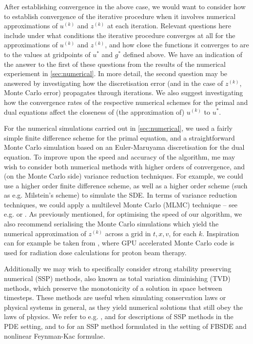 After establishing convergence in the above case, we would want to consider how to establish convergence of the iterative procedure when it involves numerical approximations of $u^{(k)}$ and $z^{(k)}$ at each iteration. Relevant questions here include under what conditions the iterative procedure converges at all for the approximations of $u^{(k)}$ and $z^{(k)}$, and how close the functions it converges to are to the values at gridpoints of $u^{*}$ and $g^{*}$ defined above. We have an indication of the answer to the first of these questions from the results of the numerical experiement in \autoref{sec:numerical}. In more detail, the second question may be answered by investigating how the discretisation error (and in the case of $z^{(k)}$, Monte Carlo error) propagates through iterations. We also suggest investigating how the convergence rates of the respective numerical schemes for the primal and dual equations affect the closeness of (the approximation of) $u^{(k)}$ to $u^{*}$.

For the numerical simulations carried out in \autoref{sec:numerical}, we used a fairly simple finite difference scheme for the primal equation, and a straightforward Monte Carlo simulation based on an Euler-Maruyama discretisation for the dual equation. To improve upon the speed and accuracy of the algorithm, me may wish to consider both numerical methods with higher orders of convergence, and (on the Monte Carlo side) variance reduction techniques. For example, we could use a higher order finite difference scheme, as well as a higher order scheme (such as e.g. Milstein's scheme) to simulate the SDE. In terms of variance reduction techniques, we could apply a multilevel Monte Carlo (MLMC) technique -- see e.g. \cite{giles2008multilevel} or \cite{gobet2016monte}. As previously mentioned, for optimising the speed of our algorithm, we also recommend serialising the Monte Carlo simulations which yield the numerical approximation of $z^{(k)}$ across a grid in $t,x,v$, for each $k$. Inspiration can for example be taken from \cite{jia2012gpu}, where GPU accelerated Monte Carlo code is used for radiation dose calculations for proton beam therapy.

Additionally we may wish to specifically consider strong stability preserving numerical (SSP) methods, also known as total variation diminishing (TVD) methods, which preserve the monotonicity of a solution in space between timesteps. These methods are useful when simulating conservation laws or physical systems in general, as they yield numerical solutions that still obey the laws of physics. We refer to e.g. \cite{gottlieb2001strong}, \cite{gottlieb2001strong} and \cite{harten1983upstream} for descriptions of SSP methods in the PDE setting, and to \cite{fang2023strong} for an SSP method formulated in the setting of FBSDE and nonlinear Feynman-Kac formulae. 

